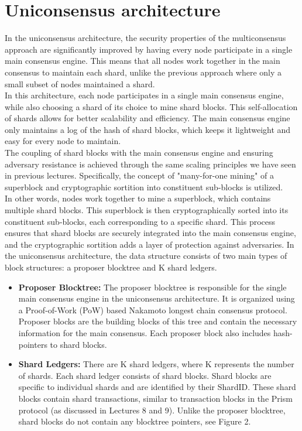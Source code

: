 \section{Uniconsensus architecture}
In the uniconsensus architecture, the security properties of the multiconsensus approach are significantly improved by having every node participate in a single main consensus engine. This means that all nodes work together in the main consensus to maintain each shard, unlike the previous approach where only a small subset of nodes maintained a shard.\\
In this architecture, each node participates in a single main consensus engine, while also choosing a shard of its choice to mine shard blocks. This self-allocation of shards allows for better scalability and efficiency. The main consensus engine only maintains a log of the hash of shard blocks, which keeps it lightweight and easy for every node to maintain.\\
The coupling of shard blocks with the main consensus engine and ensuring adversary resistance is achieved through the same scaling principles we have seen in previous lectures. Specifically, the concept of "many-for-one mining" of a superblock and cryptographic sortition into constituent sub-blocks is utilized.\\
In other words, nodes work together to mine a superblock, which contains multiple shard blocks. This superblock is then cryptographically sorted into its constituent sub-blocks, each corresponding to a specific shard. This process ensures that shard blocks are securely integrated into the main consensus engine, and the cryptographic sortition adds a layer of protection against adversaries.
In the uniconsensus architecture, the data structure consists of two main types of block structures: a proposer blocktree and K shard ledgers.\\
\begin{itemize}
	\item \textbf{Proposer Blocktree:} The proposer blocktree is responsible for the single main consensus engine in the uniconsensus architecture. It is organized using a Proof-of-Work (PoW) based Nakamoto longest chain consensus protocol. Proposer blocks are the building blocks of this tree and contain the necessary information for the main consensus. Each proposer block also includes hash-pointers to shard blocks.
	\item \textbf{Shard Ledgers:} There are K shard ledgers, where K represents the number of shards. Each shard ledger consists of shard blocks. Shard blocks are specific to individual shards and are identified by their ShardID. These shard blocks contain shard transactions, similar to transaction blocks in the Prism protocol (as discussed in Lectures 8 and 9). Unlike the proposer blocktree, shard blocks do not contain any blocktree pointers, see Figure 2.
\end{itemize}
